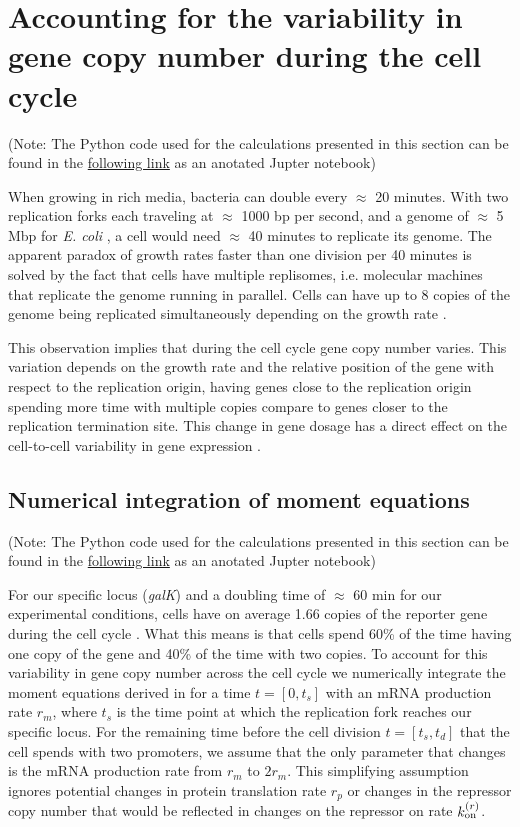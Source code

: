 \section{Accounting for the variability in gene copy number during the cell
cycle} \label{supp_multi_gene}

(Note: The Python code used for the calculations presented in this section can
be found in the
\href{https://www.rpgroup.caltech.edu/chann_cap/src/theory/html/moment_dynamics_cell_division.html}{following
link} as an anotated Jupter notebook)

When growing in rich media, bacteria can double every $\approx$ 20 minutes.
With two replication forks each traveling at $\approx$ 1000 bp per second, and
a genome of $\approx$ 5 Mbp for {\it E. coli} \cite{Moran2010}, a cell would
need $\approx$ 40 minutes to replicate its genome. The apparent paradox  of
growth rates faster than one division per 40 minutes is solved by the fact that
cells have multiple replisomes, i.e. molecular machines that replicate the
genome running in parallel. Cells can have up to 8 copies of the genome being
replicated simultaneously depending on the growth rate \cite{Bremer1996}.

This observation implies that during the cell cycle gene copy number varies.
This variation depends on the growth rate and the relative position of the gene
with respect to the replication origin, having genes close to the replication
origin spending more time with multiple copies compare to genes closer to the
replication termination site. This change in gene dosage has a direct effect on
the cell-to-cell variability in gene expression \cite{Jones2014a,
Peterson2015}.

\subsection{Numerical integration of moment equations}

(Note: The Python code used for the calculations presented in this section can
be found in the
\href{https://www.rpgroup.caltech.edu//chann_cap/software/moment_dynamics_cell_division.html}{following
link} as an anotated Jupter notebook)

For our specific locus ({\it galK}) and a doubling time of $\approx$ 60 min for
our experimental conditions, cells have on average 1.66 copies of the reporter
gene during the cell cycle \cite{Jones2014a}. What this means is that cells
spend 60\% of the time having one copy of the gene and 40\% of the time with
two copies. To account for this variability in gene copy number across the cell
cycle we numerically integrate the moment equations derived in
 for a time $t = [0, t_s]$ with an mRNA production rate
$r_m$, where $t_s$ is the time point at which the replication fork reaches our
specific locus. For the remaining time before the cell division $t = [t_s,
t_d]$ that the cell spends with two promoters, we assume that the only
parameter that changes is the mRNA production rate from $r_m$ to $2 r_m$. This
simplifying assumption ignores potential changes in protein translation rate
$r_p$ or changes in the repressor copy number that would be reflected in
changes on the repressor on rate $k^{(r)}_{\text{on}}$.

